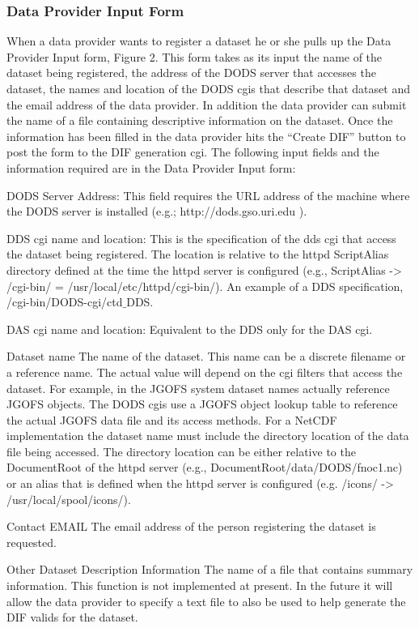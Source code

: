 \subsubsection{Data Provider Input Form}

When a data provider wants to register a dataset he or she 
pulls up the Data Provider Input form, Figure 2.  This form takes as its
input the name of the dataset being registered, the address of the DODS
server that accesses the dataset, the names and location of the DODS cgis
that describe that dataset and the email address of the data provider.  In
addition the data provider can submit the name of a file containing
descriptive information on the dataset.  Once the information has been filled
in the data provider hits the ``Create DIF'' button to post the form to the
DIF generation cgi.  The following input fields and the information required
are in the Data Provider Input form:

\begin{description}

\item{DODS Server Address:}  This field requires the URL address of the
  machine where the DODS server is installed (e.g.; http://dods.gso.uri.edu ).

\item{DDS cgi name and location:} This is the specification of the dds cgi
  that access the dataset being registered.  The location is relative to the
  httpd ScriptAlias directory defined at the time the httpd server is
  configured (e.g., ScriptAlias -> /cgi-bin/ =
  /usr/local/etc/httpd/cgi-bin/).  An example of a DDS specification,
  /cgi-bin/DODS-cgi/ctd$\_$DDS.
 
\item{DAS cgi name and location:} Equivalent to the DDS only for the DAS cgi.

\item{Dataset name} The name of the dataset.  This name can be a discrete
  filename or a reference name.  The actual value will depend on the cgi
  filters that access the dataset.  For example, in the JGOFS system dataset
  names actually reference JGOFS objects.  The DODS cgis use a JGOFS object
  lookup table to reference the actual JGOFS data file and its access
  methods.  For a NetCDF implementation the dataset name must include the
  directory location of the data file being accessed.  The directory location
  can be either relative to the DocumentRoot of the httpd server (e.g.,
  DocumentRoot/data/DODS/fnoc1.nc) or an alias that is defined when the httpd
  server is configured (e.g. /icons/ -> /usr/local/spool/icons/).

\item{Contact EMAIL} The email address of the person registering the dataset
  is requested.

\item{Other Dataset Description Information}  The name of a file that
  contains summary information.  This function is not implemented at present.
  In the future it will allow the data provider to specify a text file to
  also be used to help generate the DIF valids for the dataset. 
\end{description}

